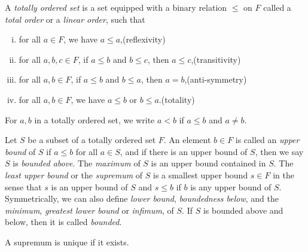 \documentclass{../../large}
\begin{document}
\begin{prb}
A \emph{totally ordered set} is a set equipped with a binary relation $\le$ on $F$ called a \emph{total order} or a \emph{linear order}, such that
\begin{enumerate}[(i)]
\item for all $a\in F$, we have $a\le a$,\hfill(reflexivity)
\item for all $a,b,c\in F$, if $a\le b$ and $b\le c$, then $a\le c$,\hfill(transitivity)
\item for all $a,b\in F$, if $a\le b$ and $b\le a$, then $a=b$,\hfill(anti-symmetry)
\item for all $a,b\in F$, we have $a\le b$ or $b\le a$.\hfill(totality)
\end{enumerate}
For $a,b$ in a totally ordered set, we write $a<b$ if $a\le b$ and $a\ne b$.

Let $S$ be a subset of a totally ordered set $F$.
An element $b\in F$ is called an \emph{upper bound} of $S$ if $a\le b$ for all $a\in S$, and if there is an upper bound of $S$, then we say $S$ is \emph{bounded above}.
The \emph{maximum} of $S$ is an upper bound contained in $S$.
The \emph{least upper bound} or the \emph{supremum} of $S$ is a smallest upper bound $s\in F$ in the sense that $s$ is an upper bound of $S$ and $s\le b$ if $b$ is any upper bound of $S$.
Symmetrically, we can also define \emph{lower bound}, \emph{boundedness below}, and the \emph{minimum}, \emph{greatest lower bound} or \emph{infimum}, of $S$.
If $S$ is bounded above and below, then it is called \emph{bounded}.
\begin{parts}
\item A supremum is unique if it exists.
\end{parts}
\end{prb}
\begin{pf}

\end{pf}
\end{document}
